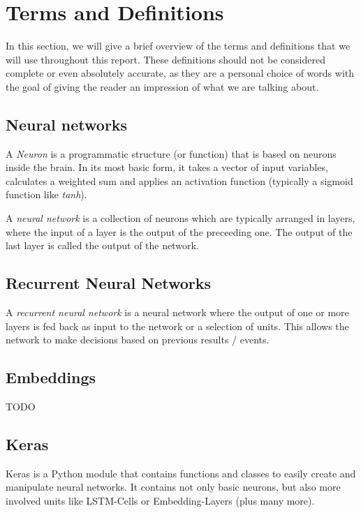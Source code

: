 \section{Terms and Definitions}
\label{sec:terms_and_definitions}

  In this section, we will give a brief overview of the terms and definitions
  that we will use throughout this report. These definitions should not be
  considered complete or even absolutely accurate, as they are a personal
  choice of words with the goal of giving the reader an impression of what
  we are talking about.

  \subsection{Neural networks}
  \label{sub:neural_networks}
  
    A \textit{Neuron} is a programmatic structure (or function) that is based
    on neurons inside the brain. In its most basic form, it takes a vector of
    input variables, calculates a weighted sum and applies an activation function
    (typically a sigmoid function like \textit{tanh}).

    A \textit{neural network} is a collection of neurons which are typically
    arranged in layers, where the input of a layer is the output of the
    preceeding one. The output of the last layer is called the output of
    the network.

  \subsection{Recurrent Neural Networks}
  \label{sub:recurrent_neural_networks}
  
    A \textit{recurrent neural network} is a neural network where the
    output of one or more layers is fed back as input to the network
    or a selection of units. This allows the network to make decisions
    based on previous results / events.

  \subsection{Embeddings}
  \label{sub:embeddings}
  
    TODO

  \subsection{Keras}
  \label{sub:keras}
  
    Keras is a Python module that contains functions and classes to easily create
    and manipulate neural networks. It contains not only basic neurons, but
    also more involved units like LSTM-Cells or Embedding-Layers (plus
    many more).


